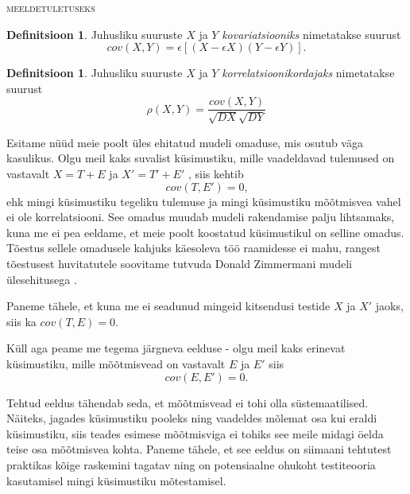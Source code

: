 \documentclass[a4paper,12pt,oneside]{article}
\newenvironment{meeldetuletus}{
	\begin{lrbox}{\thisOne}
		\begin{minipage}{0.95\textwidth} \vspace{0.25em} {\scriptsize \textsc{meeldetuletuseks}} \linebreak \vspace{-0.5em}
} 
{  
 \end{minipage}\end{lrbox}{
 		
 			\begin{mdframed}[tikzsetting={draw=black,dashed,line width=0.5pt, dash pattern = on 10pt off 3pt},%
 			linecolor=background_example,backgroundcolor=background_example,outerlinewidth=1pt]
 			\usebox{\thisOne}
 			\end{mdframed}
 		
 		
 	}
}
\numberwithin{equation}{section}
\theoremstyle{definition}
\newtheorem*{kovariatsioon}{Definitsioon}
\newtheorem*{korrelatsioon}{Definitsioon}
\begin{document}
\begin{meeldetuletus}
\begin{kovariatsioon}
Juhusliku suuruste $X$ ja $Y$ \textit{kovariatsiooniks} nimetatakse suurust
\begin{equation*}
cov(X,Y) = \epsilon \left[  \left( X - \epsilon X \right)\left(Y - \epsilon Y \right) \right]  \text{.}
\end{equation*}
\end{kovariatsioon}
\begin{korrelatsioon}
Juhusliku suuruste $X$ ja $Y$ \textit{korrelatsioonikordajaks} nimetatakse suurust 
\begin{equation*}
\rho (X,Y) = \frac{cov(X,Y)}{\sqrt{DX}\sqrt{DY}} 
\end{equation*}
\end{korrelatsioon}
\end{meeldetuletus}

Esitame nüüd meie poolt üles ehitatud mudeli omaduse, mis osutub väga kasulikus. Olgu meil kaks suvalist küsimustiku, mille vaadeldavad tulemused on vastavalt $X = T + E$ ja $X' = T' + E'$ , siis kehtib 
\begin{equation}
\label{eq:cov_zero}
cov(T,E') = 0 \text{,}
\end{equation} 
ehk mingi küsimustiku tegeliku tulemuse ja mingi küsimustiku mõõtmisvea vahel ei ole korrelatsiooni. See omadus muudab mudeli rakendamise palju lihtsamaks, kuna me ei pea eeldame, et meie poolt koostatud küsimustikul on selline omadus. Tõestus sellele omadusele kahjuks käesoleva töö raamidesse ei mahu, rangest tõestusest huvitatutele soovitame tutvuda Donald Zimmermani mudeli ülesehitusega \cite{Zimmerman1975}.

Paneme tähele, et kuna me ei seadunud mingeid kitsendusi testide $X$ ja $X'$ jaoks, siis ka $cov(T,E) = 0$.  

Küll aga peame me tegema järgneva eelduse - olgu meil kaks erinevat küsimustiku, mille mõõtmisvead on vastavalt $E$ ja $E'$ siis 
\begin{equation}
\label{eq:error_cov_0}
cov(E,E') = 0 \text{.}
\end{equation}

Tehtud eeldus tähendab seda, et mõõtmisvead ei tohi olla süstemaatilised. Näiteks, jagades küsimustiku pooleks ning vaadeldes mõlemat osa kui eraldi küsimustiku, siis teades esimese mõõtmisviga ei tohiks see meile midagi öelda teise osa mõõtmisvea kohta. Paneme tähele, et see eeldus on siimaani tehtutest praktikas kõige raskemini tagatav ning on potensiaalne ohukoht testiteooria kasutamisel mingi küsimustiku mõtestamisel. 
\end{document}
